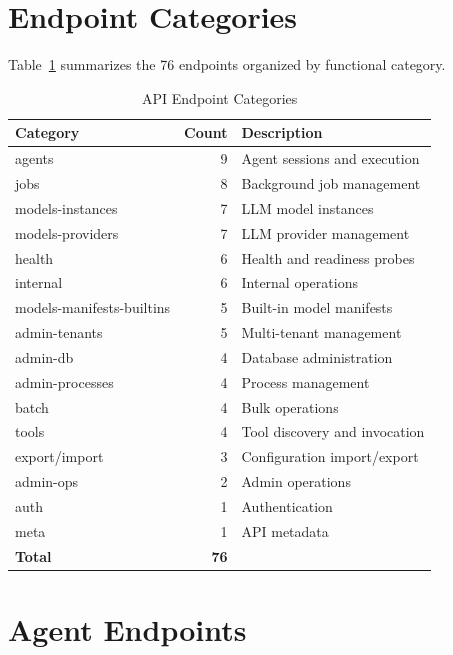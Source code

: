 \section{Endpoint Categories}
\label{app:api:categories}

Table~\ref{tab:endpoint-categories} summarizes the 76 endpoints organized by functional category.

\begin{table}[ht]
\centering
\caption{API Endpoint Categories}
\label{tab:endpoint-categories}
\small
\begin{tabularx}{\textwidth}{lrX}
    \hline
    \textbf{Category} & \textbf{Count} & \textbf{Description} \\
    \hline
    agents & 9 & Agent sessions and execution \\
    jobs & 8 & Background job management \\
    models-instances & 7 & LLM model instances \\
    models-providers & 7 & LLM provider management \\
    health & 6 & Health and readiness probes \\
    internal & 6 & Internal operations \\
    models-manifests-builtins & 5 & Built-in model manifests \\
    admin-tenants & 5 & Multi-tenant management \\
    admin-db & 4 & Database administration \\
    admin-processes & 4 & Process management \\
    batch & 4 & Bulk operations \\
    tools & 4 & Tool discovery and invocation \\
    export/import & 3 & Configuration import/export \\
    admin-ops & 2 & Admin operations \\
    auth & 1 & Authentication \\
    meta & 1 & API metadata \\
    \hline
    \textbf{Total} & \textbf{76} & \\
    \hline
\end{tabularx}
\end{table}

\section{Agent Endpoints}
\label{app:api:agents}

